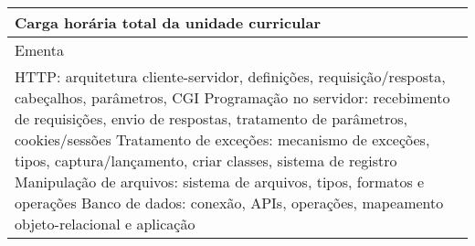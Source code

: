 \begin{quadro}[ht!]
\begin{tabular}{|p{3cm} p{2cm} p{3cm} p{2cm} p{3cm} p{2cm}|}
\multicolumn{5}{|p{13cm}|}{\cellcolor{blue1} Carga horária total da unidade curricular} & \multicolumn{1}{p{1cm}|}{\raggedleft 60	}\\\hline
\multicolumn{6}{|p{15cm}|}{\cellcolor{blue1} Ementa} \\\hline
\hline\multicolumn{6}{|p{15cm}|}{\scriptsize HTTP: arquitetura cliente-servidor, definições, requisição/resposta, cabeçalhos, parâmetros, CGI Programação no servidor: recebimento de requisições, envio de respostas, tratamento de parâmetros, cookies/sessões Tratamento de exceções: mecanismo de exceções, tipos, captura/lançamento, criar classes, sistema de registro Manipulação de arquivos: sistema de arquivos, tipos, formatos e operações Banco de dados: conexão, APIs, operações, mapeamento objeto-relacional e aplicação}\\\hline
\hline
	\end{tabular}
\end{quadro}
